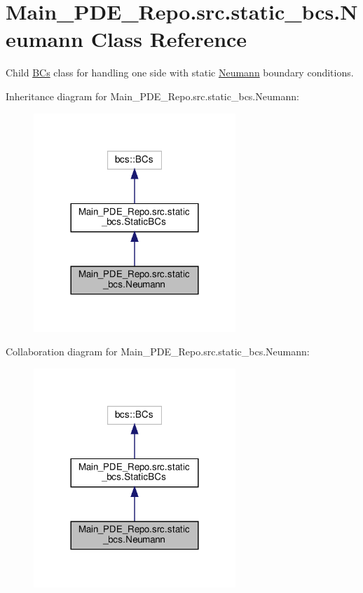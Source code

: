 \hypertarget{classMain__PDE__Repo_1_1src_1_1static__bcs_1_1Neumann}{}\section{Main\+\_\+\+P\+D\+E\+\_\+\+Repo.\+src.\+static\+\_\+bcs.\+Neumann Class Reference}
\label{classMain__PDE__Repo_1_1src_1_1static__bcs_1_1Neumann}


Child \hyperlink{namespaceMain__PDE__Repo_1_1src_1_1BCs}{B\+Cs} class for handling one side with static \hyperlink{classMain__PDE__Repo_1_1src_1_1static__bcs_1_1Neumann}{Neumann} boundary conditions.  




Inheritance diagram for Main\+\_\+\+P\+D\+E\+\_\+\+Repo.\+src.\+static\+\_\+bcs.\+Neumann\+:
\nopagebreak
\begin{figure}[H]
\begin{center}
\leavevmode
\includegraphics[width=216pt]{classMain__PDE__Repo_1_1src_1_1static__bcs_1_1Neumann__inherit__graph}
\end{center}
\end{figure}


Collaboration diagram for Main\+\_\+\+P\+D\+E\+\_\+\+Repo.\+src.\+static\+\_\+bcs.\+Neumann\+:
\nopagebreak
\begin{figure}[H]
\begin{center}
\leavevmode
\includegraphics[width=216pt]{classMain__PDE__Repo_1_1src_1_1static__bcs_1_1Neumann__coll__graph}
\end{center}
\end{figure}
